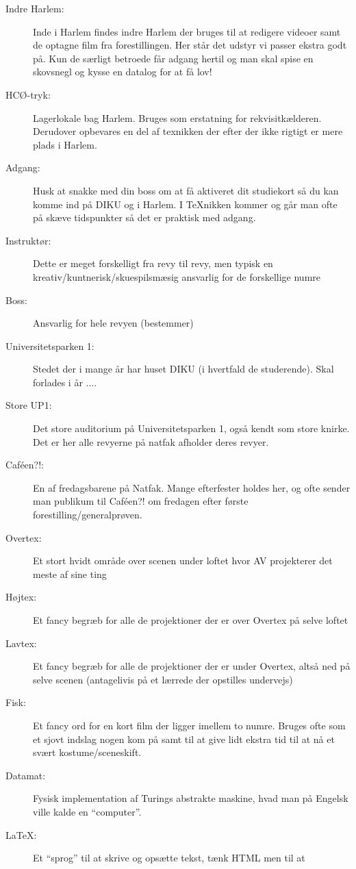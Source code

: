 \documentclass[10pt,a4paper,danish]{article}
\begin{document}
\begin{description}
\item[Indre Harlem:] Inde i Harlem findes indre Harlem der bruges til at redigere videoer samt de
  optagne film fra forestillingen.
  Her står det udstyr vi passer ekstra godt på.
  Kun de særligt betroede får adgang hertil og man skal spise en skovsnegl og
  kysse en datalog for at få lov!
\item[HCØ-tryk:] Lagerlokale bag Harlem. Bruges som erstatning for
  rekvisitkælderen. Derudover opbevares en del af texnikken der efter der ikke
  rigtigt er mere plads i Harlem.
\item[Adgang:] Husk at snakke med din boss om at få aktiveret dit studiekort så du kan komme
  ind på DIKU og i Harlem. I TeXnikken kommer og går man ofte på skæve
  tidspunkter så det er praktisk med adgang.
\item[Instruktør:] Dette er meget forskelligt fra revy til revy, men typisk en
  kreativ/kuntnerisk/skuespilsmæsig ansvarlig for de forskellige numre
\item[Boss:] Ansvarlig for hele revyen (bestemmer)
\item[Universitetsparken 1:] Stedet der i mange år har huset DIKU (i hvertfald
  de studerende). Skal forlades i år ....
\item[Store UP1:] Det store auditorium på Universitetsparken 1, også
  kendt som store knirke. Det er her alle revyerne på natfak afholder deres revyer.
\item[Caféen?!:] En af fredagsbarene på Natfak. Mange efterfester holdes her, og
  ofte sender man publikum til Caféen?! om fredagen efter første
  forestilling/generalprøven.
\item[Overtex:] Et stort hvidt område over scenen under loftet hvor AV
  projekterer det meste af sine ting
\item[Højtex:] Et fancy begræb for alle de projektioner der er over Overtex på
  selve loftet
\item[Lavtex:] Et fancy begræb for alle de projektioner der er under Overtex,
  altså ned på selve scenen (antagelivis på et lærrede der opstilles undervejs)
\item[Fisk:] Et fancy ord for en kort film der ligger imellem to numre.
  Bruges ofte som et sjovt indslag nogen kom på samt til at give lidt ekstra tid
  til at nå et svært kostume/sceneskift.
\item[Datamat:] Fysisk implementation af Turings abstrakte maskine, hvad man på
  Engelsk ville kalde en ``computer''.
\item[\LaTeX:] Et ``sprog'' til at skrive og opsætte tekst, tænk HTML men til at

\end{description}
\end{document}
